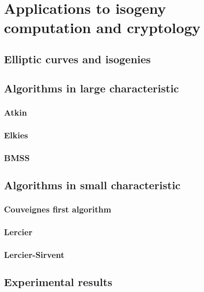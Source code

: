 \part{Applications to isogeny computation and cryptology}

\chapter{Elliptic curves and isogenies}



\chapter{Algorithms in large characteristic}
\section{Atkin}
\section{Elkies}
\section{BMSS}

\chapter{Algorithms in small characteristic}

\section{Couveignes first algorithm}
\section{Lercier}
\section{Lercier-Sirvent}






\chapter{Experimental results}




%

